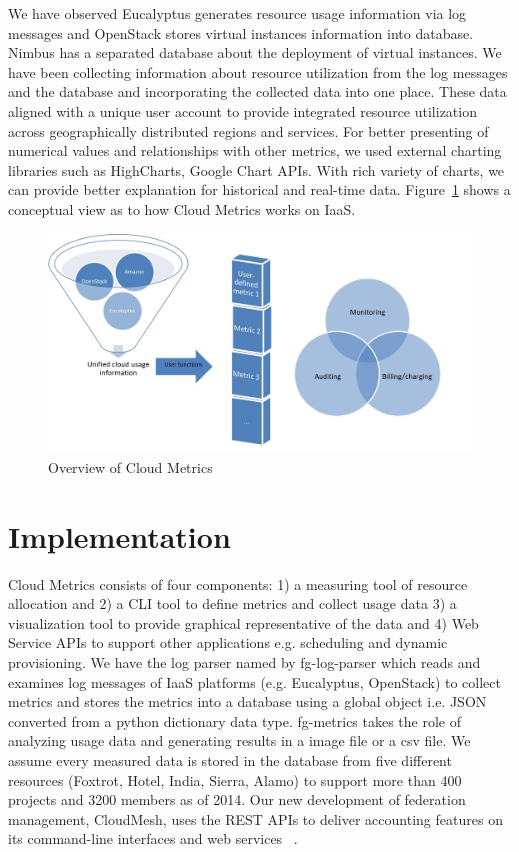 \documentclass{sig-alternate}
\begin{document}
We have observed Eucalyptus generates resource usage information via log messages and OpenStack stores virtual instances information into database. Nimbus has a separated database about the deployment of virtual instances. We have been collecting information about resource utilization from the log messages and the database and incorporating the collected data into one place. These data aligned with a unique user account to provide integrated resource utilization across geographically distributed regions and services. For better presenting of numerical values and relationships with other metrics, we used external charting libraries such as HighCharts, Google Chart APIs. With rich variety of charts, we can provide better explanation for historical and real-time data. Figure~\ref{F:fig1} shows a conceptual view as to how Cloud Metrics works on IaaS.

\begin{figure}[h!] 
  \centering 
    \includegraphics[width=1.0\columnwidth]{images/Picture1.pdf} 
  \caption{Overview of Cloud Metrics}\label{F:fig1} 
\end{figure} 


\section{Implementation} \label{S:implementation}

Cloud Metrics consists of four components: 1) a measuring tool of resource allocation  and 2) a CLI tool to define metrics and collect usage data 3) a visualization tool to provide graphical representative of the data and 4) Web Service APIs to support other applications e.g. scheduling and dynamic provisioning. We have the log parser named by fg-log-parser which reads and examines log messages of IaaS platforms (e.g. Eucalyptus, OpenStack) to collect metrics and stores the metrics into a database using a global object i.e. JSON converted from a python dictionary data type. fg-metrics takes the role of analyzing usage data and generating results in a image file or a csv file. We assume every measured data is stored in the database from five different resources (Foxtrot, Hotel, India, Sierra, Alamo) to support more than 400 projects and 3200 members as of 2014. Our new development of federation management, CloudMesh, uses the REST APIs to deliver accounting features on its command-line interfaces and web services ~\cite{cloudmesh14}.
\end{document}
